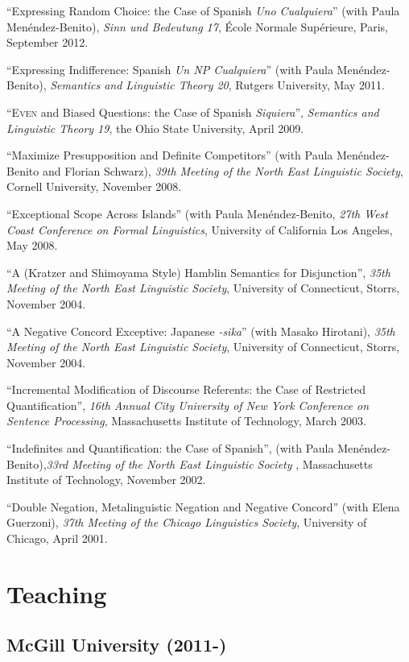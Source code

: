 \documentclass[11pt]{article}
\begin{document}
``Expressing Random
Choice: the Case of Spanish \textit{Uno Cualquiera}''  (with Paula Men\'endez-Benito), \textit{Sinn
  und Bedeutung 17}, \'{E}cole Normale Sup\'{e}rieure, Paris, September 2012.

``Expressing Indifference: Spanish \textit{Un NP
  Cualquiera}'' (with Paula Men\'endez-Benito), \textit{Semantics and
Linguistic Theory 20}, Rutgers University, May 2011. 

``\textsc{Even} and Biased Questions: the Case of Spanish \textit{Siquiera}'', \textit{Semantics and Linguistic Theory 19}, the Ohio State University, April 2009. 

``Maximize Presupposition and Definite Competitors'' (with
  Paula Men\'endez-Benito and Florian Schwarz), \textit{39th
  Meeting of the North East Linguistic Society}, Cornell University, November 2008. 


``Exceptional Scope Across Islands'' (with Paula Men\'endez-Benito, \textit{27th West Coast Conference on
  Formal Linguistics}, University of California Los Angeles, May 2008. 


``A (Kratzer and Shimoyama Style) Hamblin Semantics for Disjunction'', \textit{35th
  Meeting of the North East Linguistic Society}, University of Connecticut, Storrs, November 2004. 


``A Negative Concord Exceptive: Japanese \textit{-sika}'' (with Masako Hirotani), \textit{35th
  Meeting of the North East Linguistic Society}, University of Connecticut, Storrs, November 2004. 


``Incremental Modification of Discourse Referents: the Case of Restricted Quantification'', \textit{16th Annual City University of New York Conference on Sentence Processing}, Massachusetts Institute of Technology, March 2003. 

``Indefinites and Quantification: the Case of Spanish'', (with Paula Men\'endez-Benito),\textit{33rd
  Meeting of the North East Linguistic Society} , Massachusetts Institute of Technology,  November 2002. 

``Double Negation, Metalinguistic Negation and Negative
Concord'' (with Elena Guerzoni), \textit{37th Meeting of the Chicago
  Linguistics Society}, University of Chicago, April 2001. 

\section*{Teaching}

\subsection*{McGill University (2011-)}
\end{document}

